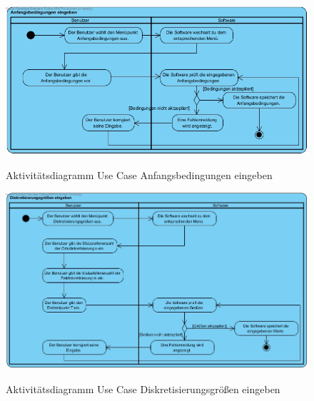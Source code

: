 \begin{figure}[H]
	\centering
	\includegraphics[scale=.5]{Bilder/Anfangsbedingungen_eingeben.jpg}\\
	\caption{Aktivitätsdiagramm Use Case Anfangsbedingungen eingeben}
	\label{Aktivitätsdiagramm Use Case Anfangsbedingungen eingeben}
\end{figure}

\begin{figure}[H]
	\centering
	\includegraphics[scale=.5]{Bilder/Diskretisierungsgroessen_eingeben.jpg}\\
	\caption{Aktivitätsdiagramm Use Case Diskretisierungsgrößen eingeben}
	\label{Aktivitätsdiagramm Use Case Diskretisierungsgroessen eingeben}
\end{figure}

